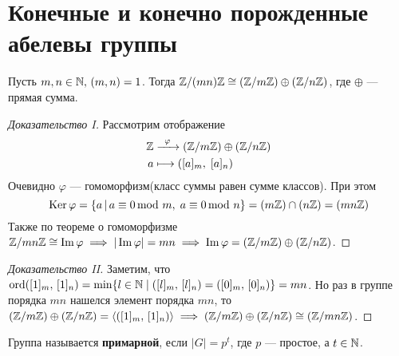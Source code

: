 \documentclass[../main.tex]{subfiles}
\begin{document}
\section{Конечные и конечно порожденные абелевы группы}

\begin{lemma}
\label{lem:6.9}
  Пусть $m, n \in \mathbb{N}, \, (m, n) = 1$. Тогда $\mathbb{Z}/(mn)\mathbb{Z} \cong (\mathbb{Z}/m\mathbb{Z}) \oplus (\mathbb{Z}/n\mathbb{Z})$, где $\oplus$ --- прямая сумма.
\end{lemma}
\begin{proof}[Доказательство I]
 Рассмотрим отображение
  \begin{align*}
    \mathbb{Z} &\xrightarrow{\;\; \varphi \;\;} (\mathbb{Z}/m\mathbb{Z}) \oplus (\mathbb{Z}/n\mathbb{Z}) \\
    a &\longmapsto ([a]_m,\; [a]_n)
  \end{align*}
  Очевидно $\varphi$ --- гомоморфизм(класс суммы равен сумме классов). При этом
  \begin{equation*}
  \operatorname{Ker} \varphi = \{a \, | \, a \equiv 0\!\!\! \mod m, \; a \equiv 0\!\!\! \mod n\}
  =
  (m\mathbb{Z}) \cap (n\mathbb{Z}) = (mn\mathbb{Z})
  \end{equation*}
  Также по теореме о гомоморфизме $\mathbb{Z}/mn\mathbb{Z} \cong \operatorname{Im} \varphi \implies |\operatorname{Im} \varphi| = mn \implies \operatorname{Im} \varphi = (\mathbb{Z}/m\mathbb{Z}) \oplus (\mathbb{Z}/n\mathbb{Z})$.
\end{proof}
\begin{proof}[Доказательство II]
  Заметим, что $\operatorname{ord}([1]_m,\, [1]_n) = \min \{l \in \mathbb{N} \; | \; ([l]_m,\, [l]_n) = ([0]_m, \, [0]_n)\} = mn$. Но раз в группе порядка $mn$ нашелся элемент порядка $mn$, то $(\mathbb{Z}/m\mathbb{Z}) \oplus (\mathbb{Z}/n\mathbb{Z}) = \left\langle ([1]_m, \, [1]_n) \right\rangle \implies (\mathbb{Z}/m\mathbb{Z}) \oplus (\mathbb{Z}/n\mathbb{Z}) \cong (\mathbb{Z}/mn\mathbb{Z})$.
\end{proof}

\begin{definition}
  Группа называется \textbf{примарной}, если $|G| = p^t$, где $p$ --- простое, а $t \in \mathbb{N}$.
\end{definition}
\end{document}
